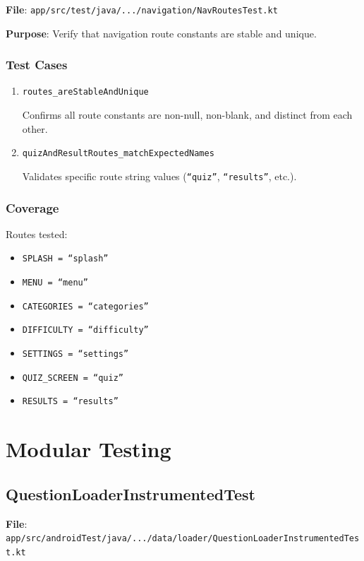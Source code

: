 \documentclass[12pt,a4paper]{article}
\begin{document}
\textbf{File}: \texttt{app/src/test/java/.../navigation/NavRoutesTest.kt}

\textbf{Purpose}: Verify that navigation route constants are stable and unique.

\subsubsection{Test Cases}

\begin{enumerate}
    \item \texttt{routes\_areStableAndUnique}
    
    Confirms all route constants are non-null, non-blank, and distinct from each other.
    
    \item \texttt{quizAndResultRoutes\_matchExpectedNames}
    
    Validates specific route string values (\texttt{``quiz''}, \texttt{``results''}, etc.).
\end{enumerate}

\subsubsection{Coverage}

Routes tested:
\begin{itemize}
    \item \texttt{SPLASH = ``splash''}
    \item \texttt{MENU = ``menu''}
    \item \texttt{CATEGORIES = ``categories''}
    \item \texttt{DIFFICULTY = ``difficulty''}
    \item \texttt{SETTINGS = ``settings''}
    \item \texttt{QUIZ\_SCREEN = ``quiz''}
    \item \texttt{RESULTS = ``results''}
\end{itemize}

\section{Modular Testing}

\subsection{QuestionLoaderInstrumentedTest}

\textbf{File}: \texttt{app/src/androidTest/java/.../data/loader/QuestionLoaderInstrumentedTest.kt}
\end{document}
